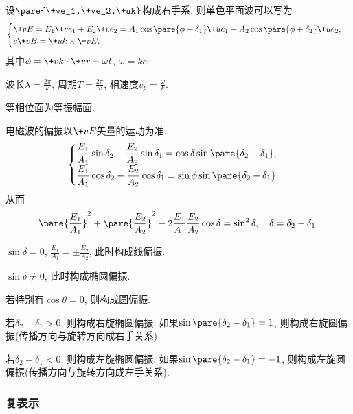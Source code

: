 \documentclass[hidelinks]{ctexart}
\begin{document}
设$\pare{\+ve_1,\+ve_2,\+uk}$构成右手系, 则单色平面波可以写为
\[ \begin{cases}
    \+vE = E_1 \+ve_1 + E_2 \+ve_2 = A_1\cos\pare{\phi + \delta_1}\+ue_1 + A_2 \cos\pare{\phi + \delta_2} \+ue_2, \\
    c\+vB = \+uk\times \+vE.
\end{cases} \]
其中$\phi = \+vk\cdot \+vr - \omega t$, $\omega = kc$.
\begin{cenum}
    \item 波长$\displaystyle \lambda = \frac{2\pi}{k}$, 周期$\displaystyle T = \frac{2\pi}{\omega}$, 相速度$\displaystyle v_p = \frac{\omega}{k}$.
    \item 等相位面为等振幅面.
    \item 电磁波的偏振以$\+vE$矢量的运动为准.
    \[ \begin{cases}
        \displaystyle \frac{E_1}{A_1}\sin \delta_2 - \frac{E_2}{A_2}\sin \delta_1 = \cos\delta \sin\pare{\delta_2 - \delta_1}, \\[0.5em]
        \displaystyle \frac{E_1}{A_1}\cos \delta_2 - \frac{E_2}{A_2}\cos \delta_1 = \sin\phi \sin\pare{\delta_2 - \delta_1}.
    \end{cases} \]
    从而
    \[ \pare{\frac{E_1}{A_1}}^2 + \pare{\frac{E_2}{A_2}}^2 - 2\frac{E_1}{A_1}\frac{E_2}{A_2}\cos\delta = \sin^2 \delta,\quad \delta = \delta_2 - \delta_1. \]
    \begin{cenum}
        \item $\sin \delta = 0$, $\displaystyle \frac{E_1}{A_1} = \pm \frac{E_2}{A_2}$, 此时构成线偏振.
        \item $\sin \delta \neq 0$, 此时构成椭圆偏振.
        \item 若特别有$\cos \theta = 0$, 则构成圆偏振.
        \begin{cenum}
            \item 若$\delta_2 - \delta_1 > 0$, 则构成右旋椭圆偏振. 如果$\sin \pare{\delta_2 - \delta_1} = 1$, 则构成右旋圆偏振(传播方向与旋转方向成右手关系).
            \item 若$\delta_2 - \delta_1 < 0$, 则构成左旋椭圆偏振. 如果$\sin \pare{\delta_2 - \delta_1} = -1$, 则构成左旋圆偏振(传播方向与旋转方向成左手关系).
        \end{cenum}
    \end{cenum}
\end{cenum}


\subsubsection{复表示} %
\label{ssub:复表示}
\end{document}
